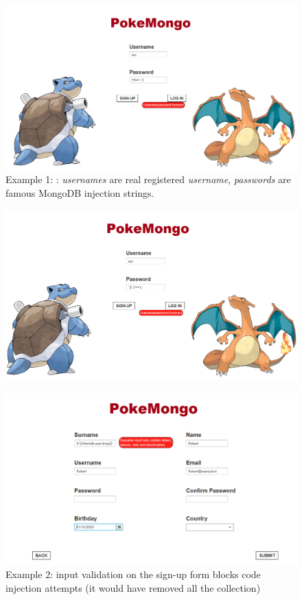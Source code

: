 \begin{figure}[H]
	\centering
	\caption{Example 1: : \textit{usernames} are real registered \textit{username}, \textit{passwords} are famous MongoDB injection strings.}
	\includegraphics[width=\textwidth]{img/privacy_1.png}
\end{figure}
\begin{figure}[H]
	\centering
	\includegraphics[width=\textwidth]{img/privacy_2.png}
\end{figure}


\begin{figure}[H]
	\centering
	\caption{Example 2: input validation on the sign-up form blocks code injection attempts (it would have removed all the collection)}
	\includegraphics[width=\textwidth]{img/privacy_3.png}
\end{figure}


